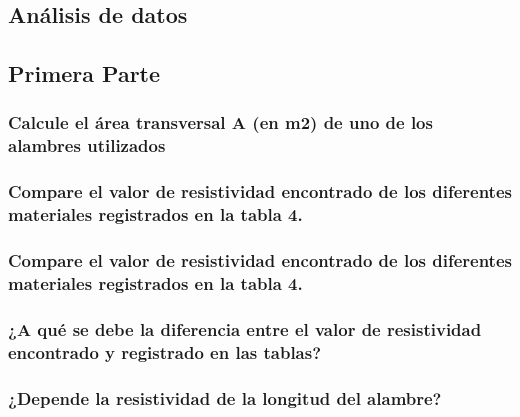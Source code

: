 \documentclass[10pt]{article}
\begin{document}
\begin{multicols}{2}

	\section{Análisis de datos}

	\subsection{Primera Parte}

	\subsubsection*{Calcule el área transversal A (en m2)
		de uno de los alambres utilizados}


	\subsubsection*{Compare el valor de resistividad encontrado de los diferentes materiales
		registrados en la tabla 4.}

	\subsubsection*{Compare el valor de resistividad encontrado de los diferentes materiales
		registrados en la tabla 4.}

	\subsubsection*{¿A qué se debe la diferencia entre el valor de resistividad encontrado y registrado
		en las tablas?}

	\subsubsection*{¿Depende la resistividad de la longitud del alambre?}


\end{multicols}
\end{document}
